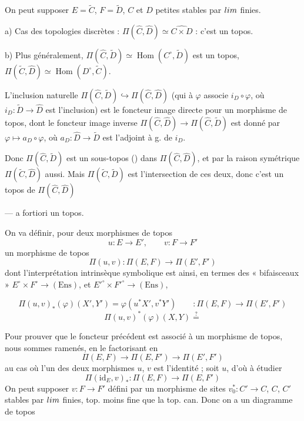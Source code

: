 \documentclass[11pt,a4paper]{article}
\begin{document}
On peut supposer $E = \widetilde{C}$, $F = \widetilde{D}$, $C$ et $D$ petites
stables par $\varprojlim$ finies.

a) Cas des topologies discrètes : $\Pi(\widehat{C}, \widehat{D}) \simeq
\widehat{C \times D}$ : c'est un topos.

b) Plus généralement, $\Pi(\widehat{C}, \widetilde{D}) \simeq
\operatorname{Hom}(C^{\circ}, \widetilde{D})$ est un topos, 
$\Pi(\widetilde{C}, \widehat{D}) \simeq \operatorname{Hom}(D^{\circ},
\widetilde{C})$.

 L'inclusion naturelle $\Pi(\widehat{C}, \widetilde{D})
\hookrightarrow \Pi(\widehat{C}, \widehat{D})$ (qui à $\varphi$ associe
$i_{D} \circ \varphi$, où $i_{D} : \widetilde{D} \to \widehat{D}$ est
l'inclusion) est le foncteur image directe pour un morphisme de topos, dont le
foncteur image inverse $\Pi(\widehat{C}, \widehat{D}) \to \Pi(\widehat{C},
\widetilde{D})$ est donné par $\varphi \mapsto a_{D} \circ \varphi$, où
$a_{D} : \widehat{D} \to \widetilde{D}$ est l'adjoint à g. de $i_{D}$.

Donc $\Pi(\widehat{C}, \widetilde{D})$ est un sous-topos
() dans $\Pi(\widehat{C}, \widehat{D})$, et par la raison
symétrique $\Pi(\widetilde{C}, \widehat{D})$ aussi. Mais $\Pi(\widetilde{C},
\widetilde{D})$ est l'intersection de ces deux, donc c'est un topos de
$\Pi(\widehat{C}, \widehat{D})$

— a fortiori un topos.

\struck{\ill{}}

On va définir, pour deux morphismes de topos
\[
u : E \longrightarrow E', \qquad v : F \longrightarrow F'
\]
un morphisme de topos
\[
\Pi(u,v) : \Pi(E,F) \longrightarrow \Pi(E',F')
\]
dont l'interprétation intrinsèque symbolique est ainsi, en termes des
« bifaisceaux » $E^{\circ} \times F^{\circ} \to (\mathrm{Ens})$, et
$E'^{\circ} \times F'^{\circ} \to (\mathrm{Ens})$,

\struck{\ill{}}
\[
\Pi(u,v)_{*}(\varphi)(X',Y') = \varphi(u^{*}X', v^{*}Y')
\qquad : \Pi(E,F) \longrightarrow \Pi(E',F')
\]
\[
\Pi(u,v)^{*}(\varphi)(X,Y) \overset{?}{=}
\]

Pour prouver que \struck{\ill{}} le foncteur précédent est associé à un
morphisme de topos, nous sommes ramenés, en le factorisant en
\[
\Pi(E,F) \longrightarrow \Pi(E,F') \longrightarrow \Pi(E',F')
\]
au cas où l'un des deux morphismes $u$, $v$ est l'identité ; soit $u$, d'où à
étudier
\[
\Pi(\mathrm{id}_{E}, v)_{*} : \Pi(E,F) \longrightarrow \Pi(E,F')
\]
On peut supposer $v : F \to F'$ défini par un morphisme de sites
$v_{0}^{*} : C' \to C$, $C$, $C'$ stables par \struck{\ill{}} $\varprojlim$
finies,  top. moins fine que la top. can. Donc on a
\struck{\ill{}} un diagramme  de topos
\end{document}

